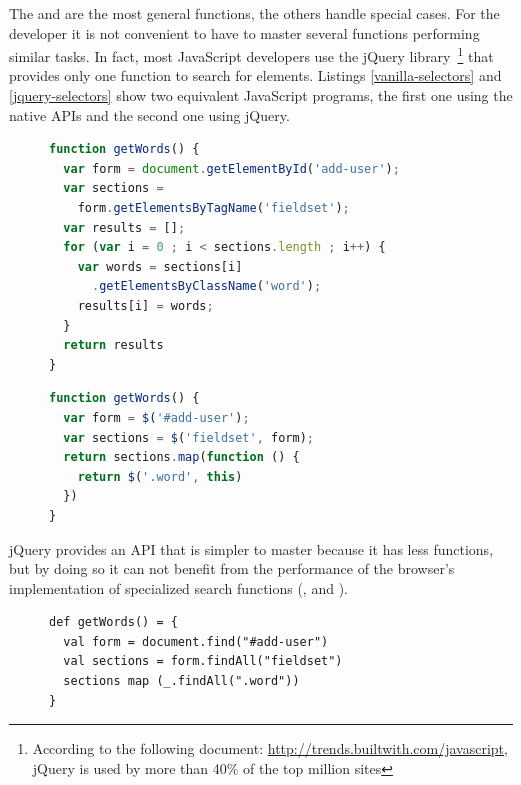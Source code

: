 \documentclass[preprint]{sigplanconf}
\begin{document}
The  and  are the most general functions, the others handle special
cases. For the developer it is not convenient to have to master several functions performing similar tasks. In fact,
most JavaScript developers use the jQuery
library~\cite{Bibeault08_jQuery}\footnote{According to the following document:
\href{http://trends.builtwith.com/javascript}{ http://trends.builtwith.com/javascript}, jQuery is used by more than
40\% of the top million sites} that provides only one function to search for elements.
Listings \ref{vanilla-selectors} and \ref{jquery-selectors} show two equivalent JavaScript programs, the first one
using the native APIs and the second one using jQuery.

\begin{figure}
\begin{lstlisting}[language=JavaScript,label=vanilla-selectors,caption=Selectors in plain JavaScript]
function getWords() {
  var form = document.getElementById('add-user');
  var sections =
    form.getElementsByTagName('fieldset');
  var results = [];
  for (var i = 0 ; i < sections.length ; i++) {
    var words = sections[i]
      .getElementsByClassName('word');
    results[i] = words;
  }
  return results
}
\end{lstlisting}
\end{figure}

\begin{figure}
\begin{lstlisting}[language=JavaScript,label=jquery-selectors,caption=Selectors in jQuery]
function getWords() {
  var form = $('#add-user');
  var sections = $('fieldset', form);
  return sections.map(function () {
    return $('.word', this)
  })
}
\end{lstlisting}
\end{figure}

jQuery provides an API that is simpler to master because it has less functions, but by doing so it can not benefit
from the performance of the browser’s implementation of specialized search functions (,
 and ).

\begin{figure}
\begin{lstlisting}[label=js-scala-selectors,caption=Selectors in js-scala]
def getWords() = {
  val form = document.find("#add-user")
  val sections = form.findAll("fieldset")
  sections map (_.findAll(".word"))
}
\end{lstlisting}
\end{figure}
\end{document}

